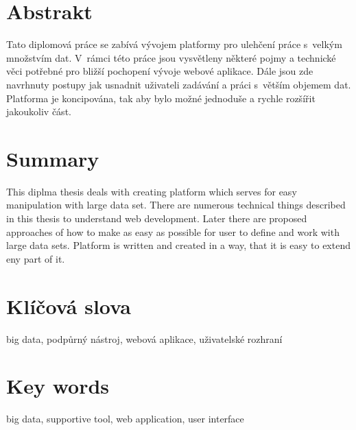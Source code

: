 \documentclass[12pt,oneside,a4paper]{report}
\newcommand\blankpage{
    \null
    \thispagestyle{empty}
    \newpage
}
\begin{document}
\afterpage{\blankpage}

\pagestyle{empty}



\section*{Abstrakt}
Tato diplomová práce se zabívá vývojem platformy pro ulehčení práce s~velkým množstvím dat. V~rámci této práce jsou vysvětleny některé pojmy a technické věci potřebné pro bližší pochopení vývoje webové aplikace. Dále jsou zde navrhnuty postupy jak usnadnit uživateli zadávání a práci s~větším objemem dat. Platforma je koncipována, tak aby bylo možné jednoduše a rychle rozšířit jakoukoliv část.
\section*{Summary}
This diplma thesis deals with creating platform which serves for easy manipulation with large data set. There are numerous technical things described in this thesis to understand web development. Later there are proposed approaches of how to make as easy as possible for user to define and work with large data sets. Platform is written and created in a way, that it is easy to extend eny part of it.

\hbox{}
\vfill

\section*{Klíčová slova}
big data, podpůrný nástroj, webová aplikace, uživatelské rozhraní
\section*{Key words}
big data, supportive tool, web application, user interface
\vskip1cm
\end{document}

